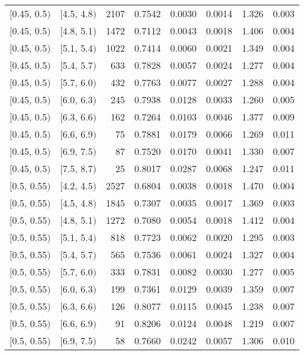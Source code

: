 \begin{longtable}{| l | l | r | r | r | r | r | r |}
        $[$0.45, 0.5$)$ & $[$4.5, 4.8$)$ & 2107 & 0.7542 & 0.0030 & 0.0014 & 1.326 & 0.003 \\
        $[$0.45, 0.5$)$ & $[$4.8, 5.1$)$ & 1472 & 0.7112 & 0.0043 & 0.0018 & 1.406 & 0.004 \\
        $[$0.45, 0.5$)$ & $[$5.1, 5.4$)$ & 1022 & 0.7414 & 0.0060 & 0.0021 & 1.349 & 0.004 \\
        $[$0.45, 0.5$)$ & $[$5.4, 5.7$)$ & 633 & 0.7828 & 0.0057 & 0.0024 & 1.277 & 0.004 \\
        $[$0.45, 0.5$)$ & $[$5.7, 6.0$)$ & 432 & 0.7763 & 0.0077 & 0.0027 & 1.288 & 0.004 \\
        $[$0.45, 0.5$)$ & $[$6.0, 6.3$)$ & 245 & 0.7938 & 0.0128 & 0.0033 & 1.260 & 0.005 \\
        $[$0.45, 0.5$)$ & $[$6.3, 6.6$)$ & 162 & 0.7264 & 0.0103 & 0.0046 & 1.377 & 0.009 \\
        $[$0.45, 0.5$)$ & $[$6.6, 6.9$)$ & 75 & 0.7881 & 0.0179 & 0.0066 & 1.269 & 0.011 \\
        $[$0.45, 0.5$)$ & $[$6.9, 7.5$)$ & 87 & 0.7520 & 0.0170 & 0.0041 & 1.330 & 0.007 \\
        $[$0.45, 0.5$)$ & $[$7.5, 8.7$)$ & 25 & 0.8017 & 0.0287 & 0.0068 & 1.247 & 0.011 \\
        $[$0.5, 0.55$)$ & $[$4.2, 4.5$)$ & 2527 & 0.6804 & 0.0038 & 0.0018 & 1.470 & 0.004 \\
        $[$0.5, 0.55$)$ & $[$4.5, 4.8$)$ & 1845 & 0.7307 & 0.0035 & 0.0017 & 1.369 & 0.003 \\
        $[$0.5, 0.55$)$ & $[$4.8, 5.1$)$ & 1272 & 0.7080 & 0.0054 & 0.0018 & 1.412 & 0.004 \\
        $[$0.5, 0.55$)$ & $[$5.1, 5.4$)$ & 818 & 0.7723 & 0.0062 & 0.0020 & 1.295 & 0.003 \\
        $[$0.5, 0.55$)$ & $[$5.4, 5.7$)$ & 565 & 0.7536 & 0.0061 & 0.0024 & 1.327 & 0.004 \\
        $[$0.5, 0.55$)$ & $[$5.7, 6.0$)$ & 333 & 0.7831 & 0.0082 & 0.0030 & 1.277 & 0.005 \\
        $[$0.5, 0.55$)$ & $[$6.0, 6.3$)$ & 199 & 0.7361 & 0.0129 & 0.0039 & 1.359 & 0.007 \\
        $[$0.5, 0.55$)$ & $[$6.3, 6.6$)$ & 126 & 0.8077 & 0.0115 & 0.0045 & 1.238 & 0.007 \\
        $[$0.5, 0.55$)$ & $[$6.6, 6.9$)$ & 91 & 0.8206 & 0.0124 & 0.0048 & 1.219 & 0.007 \\
        $[$0.5, 0.55$)$ & $[$6.9, 7.5$)$ & 58 & 0.7660 & 0.0242 & 0.0057 & 1.306 & 0.010 \\

\end{longtable}
